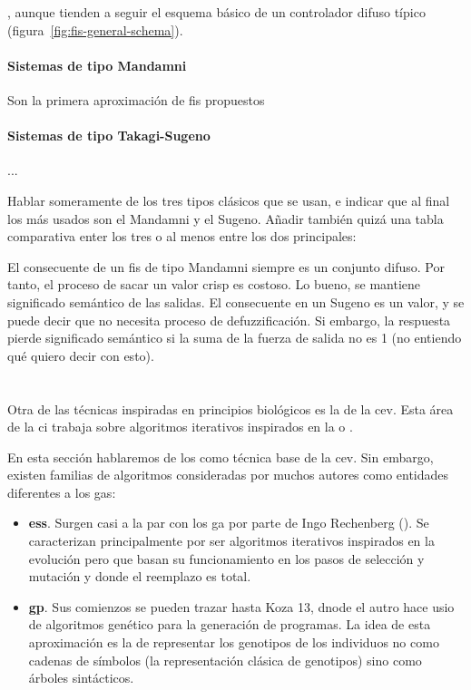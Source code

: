 , aunque tienden a seguir el esquema básico de un controlador difuso típico (figura~\ref{fig:fis-general-schema}).

\paragraph{Sistemas de tipo Mandamni}

Son la primera aproximación de \gls{fis} propuestos

\paragraph{Sistemas de tipo Takagi-Sugeno}

...

Hablar someramente de los tres tipos clásicos que se usan, e indicar que al final los más usados son el Mandamni y el Sugeno. Añadir también quizá una tabla comparativa enter los tres o al menos entre los dos principales:

El consecuente de un \ac{fis} de tipo Mandamni siempre es un conjunto difuso. Por tanto, el proceso de sacar un valor crisp es costoso. Lo bueno, se mantiene significado semántico de las salidas. El consecuente en un Sugeno es un valor, y se puede decir que no necesita proceso de defuzzificación. Si embargo, la respuesta pierde significado semántico si la suma de la fuerza de salida no es 1 (no entiendo qué quiero decir con esto).

\section{}

Otra de las técnicas inspiradas en principios biológicos es la de la \gls{cev}. Esta área de la \gls{ci} trabaja sobre algoritmos iterativos inspirados en la  o .

En esta sección hablaremos de los  como técnica base de la \gls{cev}. Sin embargo, existen familias de algoritmos consideradas por muchos autores como entidades diferentes a los \glspl{ga}:

\begin{itemize}
	\item \textbf{\glspl{es}}. Surgen casi a la par con los \gls{ga} por parte de Ingo Rechenberg (\cite{Rechenberg1973}). Se caracterizan principalmente por ser algoritmos iterativos inspirados en la evolución pero que basan su funcionamiento en los pasos de selección y mutación y donde el reemplazo es total.
	\item \textbf{\gls{gp}}. Sus comienzos se pueden trazar hasta Koza 13, dnode el autro hace usio de algoritmos genético para la generación de programas. La idea de esta aproximación es la de representar los genotipos de los individuos no como cadenas de símbolos (la representación clásica de genotipos) sino como árboles sintácticos.
\end{itemize}

